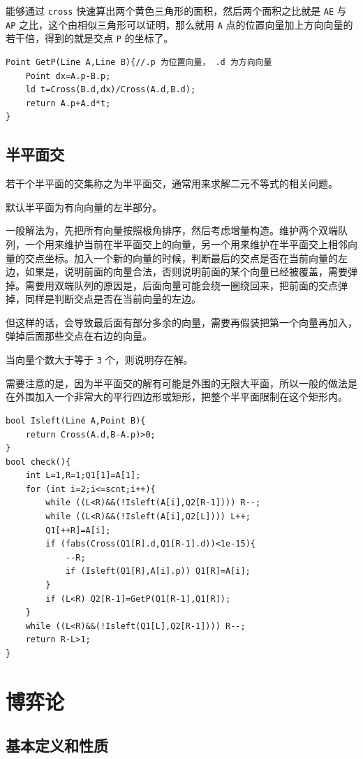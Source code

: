\documentclass[UTF-8]{ctexart}
\begin{document}
	能够通过 \texttt{cross} 快速算出两个黄色三角形的面积，然后两个面积之比就是 \texttt{AE} 与 \texttt{AP} 之比，这个由相似三角形可以证明，那么就用 \texttt{A} 点的位置向量加上方向向量的若干倍，得到的就是交点 \texttt{P} 的坐标了。
\begin{verbatim}
Point GetP(Line A,Line B){//.p 为位置向量， .d 为方向向量
    Point dx=A.p-B.p;
    ld t=Cross(B.d,dx)/Cross(A.d,B.d);
    return A.p+A.d*t;
}
\end{verbatim}
	
	\subsection{半平面交}
	若干个半平面的交集称之为半平面交，通常用来求解二元不等式的相关问题。  
	
	默认半平面为有向向量的左半部分。
	
	一般解法为，先把所有向量按照极角排序，然后考虑增量构造。维护两个双端队列，一个用来维护当前在半平面交上的向量，另一个用来维护在半平面交上相邻向量的交点坐标。加入一个新的向量的时候，判断最后的交点是否在当前向量的左边，如果是，说明前面的向量合法，否则说明前面的某个向量已经被覆盖，需要弹掉。需要用双端队列的原因是，后面向量可能会绕一圈绕回来，把前面的交点弹掉，同样是判断交点是否在当前向量的左边。  
	
	但这样的话，会导致最后面有部分多余的向量，需要再假装把第一个向量再加入，弹掉后面那些交点在右边的向量。  
	
	当向量个数大于等于 \texttt{3} 个，则说明存在解。
	
	需要注意的是，因为半平面交的解有可能是外围的无限大平面，所以一般的做法是在外围加入一个非常大的平行四边形或矩形，把整个半平面限制在这个矩形内。
	
\begin{verbatim}
bool Isleft(Line A,Point B){
    return Cross(A.d,B-A.p)>0;
}
bool check(){
    int L=1,R=1;Q1[1]=A[1];
    for (int i=2;i<=scnt;i++){
        while ((L<R)&&(!Isleft(A[i],Q2[R-1]))) R--;
        while ((L<R)&&(!Isleft(A[i],Q2[L]))) L++;
        Q1[++R]=A[i];
        if (fabs(Cross(Q1[R].d,Q1[R-1].d))<1e-15){
            --R;
            if (Isleft(Q1[R],A[i].p)) Q1[R]=A[i];
        }
        if (L<R) Q2[R-1]=GetP(Q1[R-1],Q1[R]);
    }
    while ((L<R)&&(!Isleft(Q1[L],Q2[R-1]))) R--;
    return R-L>1;
}
\end{verbatim}
\section{博弈论}
	\subsection{基本定义和性质}
\end{document}

